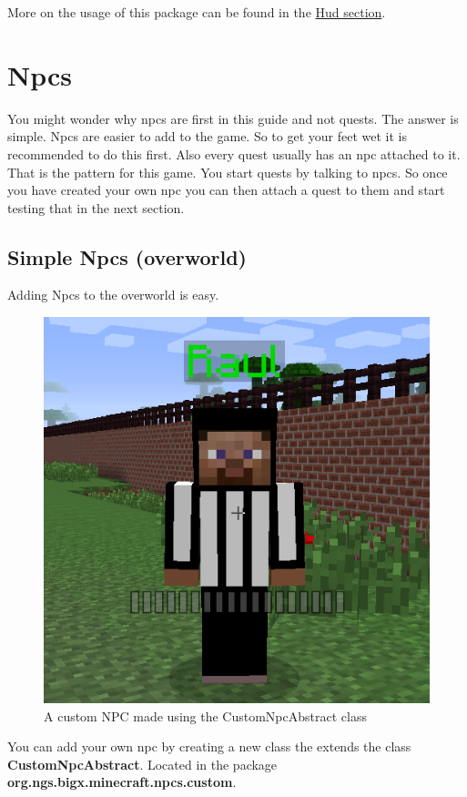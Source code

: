 \documentclass[12pt]{article}
\begin{document}
More on the usage of this package can be found in the \hyperref[sec:hud]{Hud section}.

\section{Npcs}
\label{sec:npcs}

You might wonder why npcs are first in this guide and not quests. The answer is simple. Npcs are easier to add to the game. So to get your feet wet it is recommended to do this first. Also every quest usually has an npc attached to it. That is the pattern for this game. You start quests by talking to npcs. So once you have created your own npc you can then attach a quest to them and start testing that in the next section.

\subsection{Simple Npcs (overworld)}

Adding Npcs to the overworld is easy.
\begin{figure}[H]
	\caption{A custom NPC made using the CustomNpcAbstract class}
	\includegraphics[scale=0.5]{images/npcs/Raul.png}
	\centering
\end{figure}

You can add your own npc by creating a new class the extends the class {\bfseries CustomNpcAbstract}. Located in the package {\bfseries org.ngs.bigx.minecraft.npcs.custom}.
\end{document}
